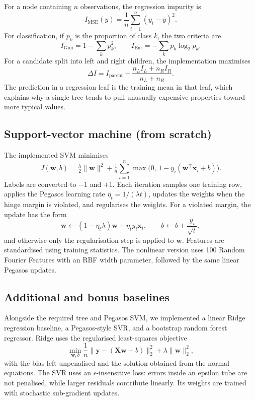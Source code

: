 \documentclass[10pt,twocolumn,a4paper]{article}
\begin{document}
For a node containing $n$ observations, the regression impurity is
\[
 I_{\mathrm{MSE}}(y)=\frac{1}{n}\sum_{i=1}^{n}(y_i-\bar y)^2.
\]
For classification, if $p_k$ is the proportion of class $k$, the two
criteria are
\[
 I_{\mathrm{Gini}}=1-\sum_k p_k^2,\qquad
 I_{\mathrm{Ent}}=-\sum_k p_k\log_2 p_k.
\]
For a candidate split into left and right children, the implementation
maximises
\[
 \Delta I=I_{\mathrm{parent}}-
 \frac{n_L I_L+n_R I_R}{n_L+n_R}.
\]
The prediction in a regression leaf is the training mean in that leaf,
which explains why a single tree tends to pull unusually expensive
properties toward more typical values.

\subsection{Support-vector machine (from scratch)}
The implemented SVM minimises
\begin{equation}
  J(\mathbf{w},b)=\tfrac{\lambda}{2}\lVert\mathbf{w}\rVert^{2}
  +\tfrac{1}{n}\sum_{i=1}^{n}\max\!\big(0,\,1-y_i(\mathbf{w}^{\top}\mathbf{x}_i+b)\big).
\end{equation}
Labels are converted to $-1$ and $+1$. Each iteration samples one training
row, applies the Pegasos learning rate $\eta_t=1/(\lambda t)$, updates the
weights when the hinge margin is violated, and regularises the weights.
For a violated margin, the update has the form
\[
 \mathbf{w}\leftarrow(1-\eta_t\lambda)\mathbf{w}
 +\eta_t y_i\mathbf{x}_i,\qquad
 b\leftarrow b+\frac{y_i}{\sqrt{t}},
\]
and otherwise only the regularisation step is applied to $\mathbf{w}$.
Features are standardised using training statistics. The nonlinear version
uses 100 Random Fourier Features with an RBF width parameter, followed by
the same linear Pegasos updates.

\subsection{Additional and bonus baselines}
Alongside the required tree and Pegasos SVM, we implemented a linear Ridge
regression baseline, a Pegasos-style SVR, and a bootstrap random forest
regressor. Ridge uses the regularised least-squares objective
\[
 \min_{\mathbf{w},b}\frac{1}{n}\lVert\mathbf{y}
 -(\mathbf{Xw}+b)\rVert_2^2+\lambda\lVert\mathbf{w}\rVert_2^2,
\]
with the bias left unpenalised and the solution obtained from the normal
equations. The SVR uses an $\epsilon$-insensitive loss: errors inside an
epsilon tube are not penalised, while larger residuals contribute linearly.
Its weights are trained with stochastic sub-gradient updates.
\end{document}
